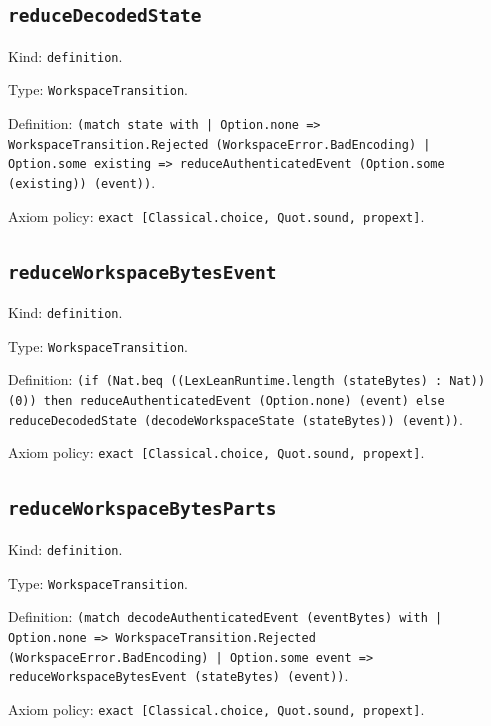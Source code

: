 \documentclass[11pt]{article}
\begin{document}
\subsection*{\texttt{reduceDecodedState}}
\noindent Kind: \texttt{definition}.\par
\noindent Type: \texttt{WorkspaceTransition}.\par
\noindent Definition: \texttt{(match state with | Option.none => WorkspaceTransition.Rejected (WorkspaceError.BadEncoding) | Option.some existing => reduceAuthenticatedEvent (Option.some (existing)) (event))}.\par
\noindent Axiom policy: \texttt{exact [Classical.choice, Quot.sound, propext]}.\par
\subsection*{\texttt{reduceWorkspaceBytesEvent}}
\noindent Kind: \texttt{definition}.\par
\noindent Type: \texttt{WorkspaceTransition}.\par
\noindent Definition: \texttt{(if (Nat.beq ((LexLeanRuntime.length (stateBytes) : Nat)) (0)) then reduceAuthenticatedEvent (Option.none) (event) else reduceDecodedState (decodeWorkspaceState (stateBytes)) (event))}.\par
\noindent Axiom policy: \texttt{exact [Classical.choice, Quot.sound, propext]}.\par
\subsection*{\texttt{reduceWorkspaceBytesParts}}
\noindent Kind: \texttt{definition}.\par
\noindent Type: \texttt{WorkspaceTransition}.\par
\noindent Definition: \texttt{(match decodeAuthenticatedEvent (eventBytes) with | Option.none => WorkspaceTransition.Rejected (WorkspaceError.BadEncoding) | Option.some event => reduceWorkspaceBytesEvent (stateBytes) (event))}.\par
\noindent Axiom policy: \texttt{exact [Classical.choice, Quot.sound, propext]}.\par
\end{document}
